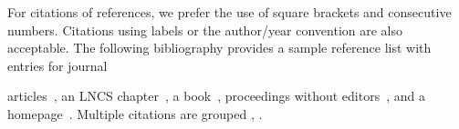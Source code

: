 \documentclass[runningheads]{llncs}
\begin{document}
For citations of references, we prefer the use of square brackets
and consecutive numbers. Citations using labels or the author/year
convention are also acceptable. The following bibliography provides
a sample reference list with entries for journal

\begin{thebibliography}{8}
articles~\cite{ref_article1}, an LNCS chapter~\cite{ref_lncs1}, a
book~\cite{ref_book1}, proceedings without editors~\cite{ref_proc1},
and a homepage~\cite{ref_url1}. Multiple citations are grouped
\cite{ref_article1,ref_lncs1,ref_book1},
\cite{ref_article1,ref_book1,ref_proc1,ref_url1}.
\end{thebibliography}
\end{document}
